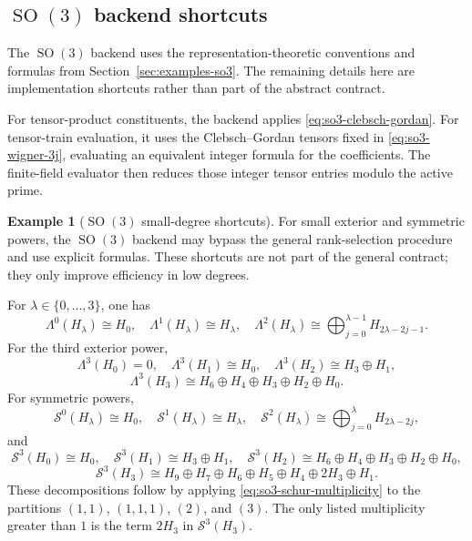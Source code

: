 \documentclass[11pt]{article}
\newcommand{\scS}{\mathcal{S}}
\newcommand{\SO}{\operatorname{SO}}
\newcommand{\set}[1]{\{#1\}}
\theoremstyle{definition}
\newtheorem{example}[theorem]{Example}
\begin{document}
\subsection[SO(3) backend shortcuts]{\texorpdfstring{$\SO(3)$}{SO(3)} backend shortcuts}

The $\SO(3)$ backend uses the representation-theoretic conventions and formulas from Section~\ref{sec:examples-so3}.  The remaining details here are implementation shortcuts rather than part of the abstract contract.

For tensor-product constituents, the backend applies \eqref{eq:so3-clebsch-gordan}.  For tensor-train evaluation, it uses the Clebsch--Gordan tensors fixed in \eqref{eq:so3-wigner-3j}, evaluating an equivalent integer formula for the coefficients.  The finite-field evaluator then reduces those integer tensor entries modulo the active prime.

\begin{example}[$\SO(3)$ small-degree shortcuts]\label{ex:so3-small-degree-shortcuts}
  For small exterior and symmetric powers, the $\SO(3)$ backend may bypass the general rank-selection procedure and use explicit formulas.  These shortcuts are not part of the general contract; they only improve efficiency in low degrees.

  For $\lambda\in\set{0,\dots,3}$, one has
  \[
    \Lambda^0(H_\lambda)\cong H_0,
    \quad
    \Lambda^1(H_\lambda)\cong H_\lambda,
    \quad
    \Lambda^2(H_\lambda)\cong \bigoplus_{j=0}^{\lambda-1} H_{2\lambda-2j-1}.
  \]
  For the third exterior power,
  \[
    \Lambda^3(H_0)=0,
    \quad
    \Lambda^3(H_1)\cong H_0,
    \quad
    \Lambda^3(H_2)\cong H_3\oplus H_1,
  \]
  \[
    \Lambda^3(H_3)\cong H_6\oplus H_4\oplus H_3\oplus H_2\oplus H_0.
  \]
  For symmetric powers,
  \[
    \scS^0(H_\lambda)\cong H_0,
    \quad
    \scS^1(H_\lambda)\cong H_\lambda,
    \quad
    \scS^2(H_\lambda)\cong \bigoplus_{j=0}^{\lambda} H_{2\lambda-2j},
  \]
  and
  \[
    \scS^3(H_0)\cong H_0,
    \quad
    \scS^3(H_1)\cong H_3\oplus H_1,
    \quad
    \scS^3(H_2)\cong H_6\oplus H_4\oplus H_3\oplus H_2\oplus H_0,
  \]
  \[
    \scS^3(H_3)\cong H_9\oplus H_7\oplus H_6\oplus H_5\oplus H_4\oplus 2H_3\oplus H_1.
  \]
  These decompositions follow by applying \eqref{eq:so3-schur-multiplicity} to the partitions $(1,1)$, $(1,1,1)$, $(2)$, and $(3)$.  The only listed multiplicity greater than $1$ is the term $2H_3$ in $\scS^3(H_3)$.
\end{example}
\end{document}
